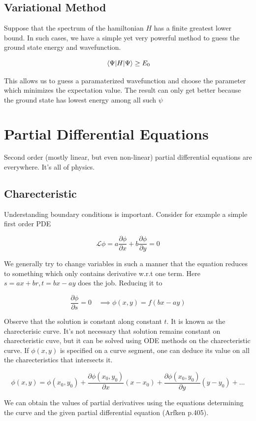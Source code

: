\documentclass{report}
\begin{document}
\subsection{Variational Method}
Suppose that the spectrum of the hamiltonian $H$ has a finite greatest lower bound. In such cases, we have a simple yet very powerful method to guess the ground state energy and wavefunction.


$$\expval{H}{\Psi} \ge E_0$$

\noindent This allows us to guess a paramaterized wavefunction and choose the parameter which minimizes the expectation value. The result can only get better because the ground state has lowest energy among all such $\psi$


\section{Partial Differential Equations}
Second order (mostly linear, but even non-linear) partial differential equations are everywhere. It's all of physics. 

\subsection{Charecteristic}
Understanding boundary conditions is important. Consider for example a simple first order PDE

$$\mathcal{L}\phi = a\frac{\partial\phi}{\partial x} + b\frac{\partial\phi}{\partial y} = 0$$

\noindent We generally try to change variables in such a manner that the equation reduces to something which only contains derivative w.r.t one term. Here $s = ax+br, t= bx-ay$ does the job. Reducing it to 

$$\frac{\partial\phi}{\partial s} = 0 \quad\implies \phi(x,y) = f(bx-ay)$$

\noindent Observe that the solution is constant along constant $t$. It is known as the charecterisic curve. It's not necessary that solution remains constant on charecteristic cuve, but it can be solved using ODE methods on the charecteristic curve. If $\phi(x,y)$ is specified on a curve segment, one can deduce its value on all the charecteristics that intersects it.

$$\phi(x,y) = \phi(x_0,y_0) + \frac{\partial \phi(x_0,y_0)}{\partial x}(x-x_0) + \frac{\partial\phi(x_0,y_0)}{\partial y}(y-y_0) + ...$$

\noindent We can obtain the values of partial derivatives using the equations determining the curve and the given partial differential equation (Arfken p.405).\\
\end{document}
